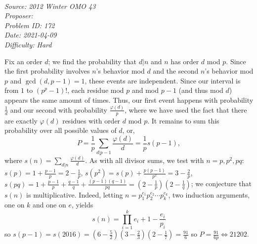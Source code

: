 \SSbreak\\
\emph{Source: 2012 Winter OMO 43}\\
\emph{Proposer: \Paiya}\\ %
\emph{Problem ID: 172}\\
\emph{Date: 2021-04-09}\\
\emph{Difficulty: Hard}\\
\SSbreak

\bigskip

\begin{solution}\hfil\medskip
	
	Fix an order $d$; we find the probability that $d|n$ and $n$ has order $d$ mod $p$. Since the first probability involves $n$'s behavior mod $d$ and the second $n$'s behavior mod $p$ and $\gcd(d, p - 1) = 1$, these events are independent. Since our interval is from $1$ to $\left(p^p - 1\right)!$, each residue mod $p$ and mod $p - 1$ (and thus mod $d$) appears the same amount of times. Thus, our first event happens with probability $\frac{1}{d}$ and our second with probability $\frac{\varphi(d)}{p}$, where we have used the fact that there are exactly $\varphi(d)$ residues with order $d$ mod $p$. It remains to sum this probability over all possible values of $d$, or, $$P = \dfrac{1}{p} \sum_{d|p - 1} \dfrac{\varphi(d)}{d} = \dfrac{1}{p} s(p - 1),$$ where $s(n) = \sum_{d|n} \frac{\varphi(d)}{d}$. As with all divisor sums, we test with $n = p, p^2, pq$: $s(p) = 1 + \frac{p - 1}{p} = 2 - \frac{1}{p}$, $s\left(p^2\right) = s(p) + \frac{p(p - 1)}{p^2} = 3 - \frac{2}{p}$, $s(pq) = 1 + \frac{p - 1}{p} + \frac{q - 1}{q} + \frac{(p - 1)(q - 1)}{pq} = \left(2 - \frac{1}{p}\right)\left(2 - \frac{1}{q}\right)$; we conjecture that $s(n)$ is multiplicative. Indeed, letting $n = p_1^{e_1}p_2^{e_2} \cdots p_k^{e_k}$, two induction arguments, one on $k$ and one on $e$, yields $$s(n) = \prod_{i = 1}^k e_i + 1 - \dfrac{e_i}{p_i}$$ so $s(p - 1) = s(2016) = \left(6 - \frac{5}{2}\right)\left(3 - \frac{2}{3}\right)\left(2 - \frac{1}{7}\right) = \frac{91}{6}$ so $P = \frac{91}{6p} \iff \boxed{21202}$. 
\end{solution}\bigskip
